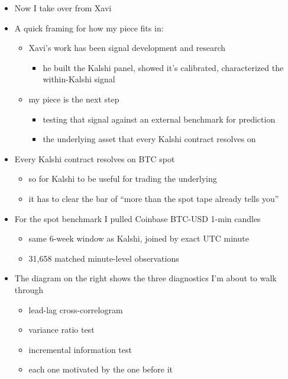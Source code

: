 \documentclass[
]{article}
\providecommand{\tightlist}{%
  \setlength{\itemsep}{0pt}\setlength{\parskip}{0pt}}
\begin{document}
\begin{itemize}
\tightlist
\item
  Now I take over from Xavi
\item
  A quick framing for how my piece fits in:

  \begin{itemize}
  \tightlist
  \item
    Xavi's work has been signal development and research

    \begin{itemize}
    \tightlist
    \item
      he built the Kalshi panel, showed it's calibrated, characterized
      the within-Kalshi signal
    \end{itemize}
  \item
    my piece is the next step

    \begin{itemize}
    \tightlist
    \item
      testing that signal against an external benchmark for prediction
    \item
      the underlying asset that every Kalshi contract resolves on
    \end{itemize}
  \end{itemize}
\item
  Every Kalshi contract resolves on BTC spot

  \begin{itemize}
  \tightlist
  \item
    so for Kalshi to be useful for trading the underlying
  \item
    it has to clear the bar of ``more than the spot tape already tells
    you''
  \end{itemize}
\item
  For the spot benchmark I pulled Coinbase BTC-USD 1-min candles

  \begin{itemize}
  \tightlist
  \item
    same 6-week window as Kalshi, joined by exact UTC minute
  \item
    31,658 matched minute-level observations
  \end{itemize}
\item
  The diagram on the right shows the three diagnostics I'm about to walk
  through

  \begin{itemize}
  \tightlist
  \item
    lead-lag cross-correlogram
  \item
    variance ratio test
  \item
    incremental information test
  \item
    each one motivated by the one before it
  \end{itemize}
\end{itemize}
\end{document}
